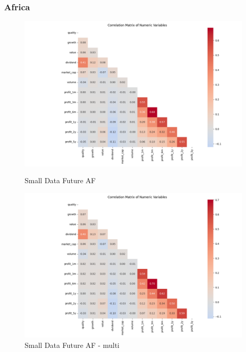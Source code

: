 \documentclass[11pt,english,a4paper,hidelinks]{book}
\begin{document}
\subsubsection{Africa}
\begin{figure}[H]
    \centering
    \begin{minipage}{0.48\textwidth}
        \centering
        \includegraphics[width=\linewidth]{images/code/descriptive analysis/correlations/Small Data future AF.png}
        \caption{Small Data Future AF}
        \label{fig:small_data_future_af_correlations}
    \end{minipage}
    \begin{minipage}{0.48\textwidth}
        \centering
        \includegraphics[width=\linewidth]{images/code/descriptive analysis/correlations/Small Data future AF - Multi.png}
        \caption{Small Data Future AF - \acrshort{multi}}
        \label{fig:small_data_future_af_multi_correlations}
    \end{minipage}
\end{figure}
\end{document}
